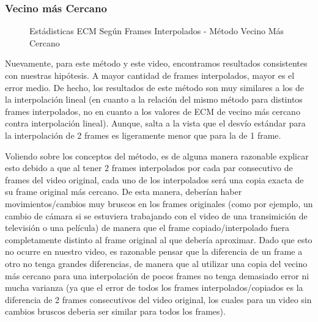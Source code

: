\subsubsection{Vecino m\'as Cercano}

\begin{figure}[H]
    \centering
    \caption{Est\'adisticas ECM Seg\'un Frames Interpolados - M\'etodo Vecino M\'as Cercano}
    \label{fig:fija-movil_vecino-mse_estadisticas}
\end{figure}

\par Nuevamente, para este m\'etodo y este video, encontramos resultados
consistentes con nuestras hip\'otesis. A mayor cantidad de frames interpolados,
mayor es el error medio. De hecho, los resultados de este m\'etodo son muy
similares a los de la interpolaci\'on lineal (en cuanto a la relaci\'on del
mismo m\'etodo para distintos frames interpolados, no en cuanto a los valores
de ECM de vecino m\'as cercano contra interpolaci\'on lineal). Aunque, salta a
la vista que el desv\'io est\'andar para la interpolaci\'on de 2 frames es
ligeramente menor que para la de 1 frame.

\par Voliendo sobre los conceptos del m\'etodo, es de alguna manera razonable
explicar esto debido a que al tener 2 frames interpolados por cada par
consecutivo de frames del video original, cada uno de los interpolados ser\'a
una copia exacta de su frame original m\'as cercano. De esta manera, deber\'ian
haber movimientos/cambios muy bruscos en los frames originales (como por
ejemplo, un cambio de c\'amara si se estuviera trabajando con el video de una
transimici\'on de televisi\'on o una pel\'icula) de manera que el frame
copiado/interpolado fuera completamente distinto al frame original al que
deber\'ia aproximar. Dado que esto no ocurre en nuestro video, es razonable
pensar que la diferencia de un frame a otro no tenga grandes diferencias, de
manera que al utilizar una copia del vecino m\'as cercano para una
interpolaci\'on de pocos frames no tenga demasiado error ni mucha varianza (ya
que el error de todos los frames interpolados/copiados es la diferencia de 2
frames consecutivos del video original, los cuales para un video sin cambios
bruscos deberia ser similar para todos los frames).

